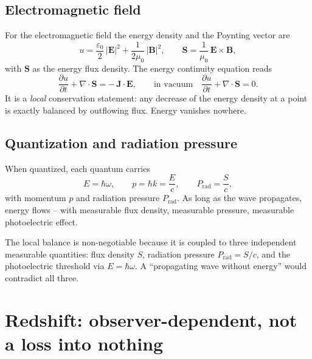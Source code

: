 \subsection{Electromagnetic field}

For the electromagnetic field the energy density and the Poynting
vector are~\cite{poynting1884,jackson}
\begin{equation}
  u = \frac{\varepsilon_0}{2}\,|\mathbf E|^2
      + \frac{1}{2\mu_0}\,|\mathbf B|^2,
  \qquad
  \mathbf S = \frac{1}{\mu_0}\,\mathbf E\times\mathbf B,
  \label{eq:poynting277}
\end{equation}
with $\mathbf S$ as the energy flux density. The energy continuity equation
reads
\begin{equation}
  \frac{\partial u}{\partial t} + \nabla\!\cdot\mathbf S = -\,\mathbf J\!\cdot\mathbf E,
  \qquad\text{in vacuum}\quad
  \frac{\partial u}{\partial t} + \nabla\!\cdot\mathbf S = 0.
  \label{eq:cont277}
\end{equation}
It is a \emph{local} conservation statement: any decrease of the energy density
at a point is exactly balanced by outflowing flux. Energy vanishes nowhere.

\subsection{Quantization and radiation pressure}

When quantized, each quantum carries
\begin{equation}
  E = \hbar\omega, \qquad
  p = \hbar k = \frac{E}{c}, \qquad
  P_\text{rad} = \frac{S}{c},
  \label{eq:quant277}
\end{equation}
with momentum $p$ and radiation pressure $P_\text{rad}$. As long as the wave
propagates, energy flows -- with measurable flux density, measurable pressure,
measurable photoelectric effect.

\begin{insight}
The local balance is non-negotiable because it is coupled to three independent
measurable quantities: flux density $S$, radiation pressure
$P_\text{rad}=S/c$, and the photoelectric threshold via $E=\hbar\omega$. A
\enquote{propagating wave without energy} would contradict all three.
\end{insight}

\section{Redshift: observer-dependent, not a loss into nothing}

